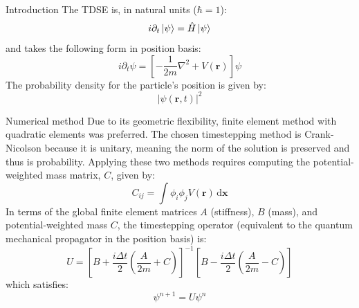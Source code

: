 \documentclass[final]{beamer}
\newlength{\onecolwid}
\begin{document}
\begin{frame}[t]
\begin{columns}[t]
\begin{column}{\onecolwid}
\begin{block}{Introduction}
The TDSE is, in natural units ($\hbar=1$):
\begin{equation}
i\partial_{t}\ket{\psi}=\hat{H}\ket{\psi}
\end{equation}
and takes the following form in position basis:
\begin{equation}
i\partial_{t}\psi=\left[-\frac{1}{2m}\nabla^{2}+V\left(\mathbf{r}\right)\right]\psi
\label{SchrodPosBasis}
\end{equation}
The probability density for the particle's position is given by:
\begin{equation}
\left|\psi\left(\mathbf{r},t\right)\right|^{2}
\end{equation}
\end{block}
\begin{block}{Numerical method}
Due to its geometric flexibility, finite element method with quadratic elements was preferred. The chosen timestepping method is Crank-Nicolson because it is unitary, meaning the norm of the solution is preserved and thus is probability. Applying these two methods requires computing the potential-weighted mass matrix, $C$, given by:
\begin{equation}
C_{ij} = \int\phi_{i}\phi_{j}V\left(\mathbf{r}\right)\,\mathrm{d}\mathbf{x}
\end{equation}
In terms of the global finite element matrices $A$ (stiffness), $B$ (mass), and potential-weighted mass $C$, the timestepping operator (equivalent to the quantum mechanical propagator in the position basis) is:
\begin{equation}
U=\left[B+\frac{i\Delta t}{2}\left(\frac{A}{2m}+C\right)\right]^{-1}\left[B-\frac{i\Delta t}{2}\left(\frac{A}{2m}-C\right)\right]
\end{equation}
which satisfies:
\begin{equation}
\psi^{n+1}=U\psi^{n}
\end{equation}
\end{block}




\end{column}
\end{columns}
\end{frame}
\end{document}
